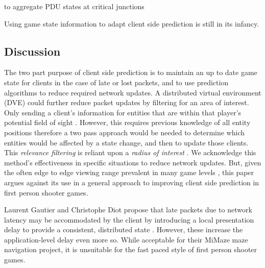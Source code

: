 \documentclass[journal]{IEEEtran}
\begin{document}
to aggregate PDU states at critical junctions

Using game state information to adapt client side prediction is still in its infancy.


\subsection{Discussion}

The two part purpose of client side prediction is to maintain an up to date game state for clients in the case of late or lost packets, and to use prediction algorithms to reduce required network updates. A distributed virtual environment (DVE) could further reduce packet updates by filtering for an area of interest. Only sending a client's information for entities that are within that player’s potential field of sight \cite{cronin2001distributed}. However, this requires previous knowledge of all entity positions therefore a two pass approach would be needed to determine which entities would be affected by a state change, and then to update those clients. This \textit{relevance filtering} is reliant upon a \textit{radius of interest} \cite{rak1996evaluation}.  We acknowledge this method's effectiveness in specific situations to reduce network updates. But, given the often edge to edge viewing range prevalent in many game levels \cite{toby2014tobyscs} \cite{ziervogel2014nag} \cite{cod2018wikibo4}, this paper argues against its use in a general approach to improving client side prediction in first person shooter games.

Laurent Gautier and Christophe Diot propose that late packets due to network latency may be accommodated by the client by introducing a local presentation delay to provide a consistent, distributed state \cite{gautier1998design}. However, these increase the application-level delay even more so. While acceptable for their MiMaze maze navigation project, it is unsuitable for the fast paced style of first person shooter games.
\end{document}
